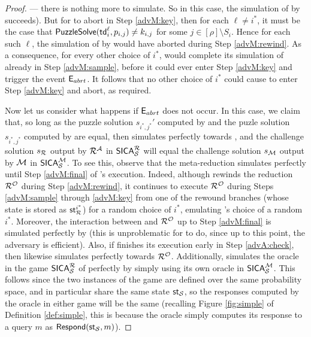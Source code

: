 \begin{proof}
  --- there is nothing more to simulate. So in this case, the simulation of \advA by \redM succeeds).
  But for \redM to abort in Step \ref{advM:key},
  then for each \(\ell \ne i^{*}\),
  it must be the case that
  \(\mathsf{PuzzleSolve}(\mathsf{td}_{i}^{\ell},p_{i,j}) \ne k_{i,j}\) for some \(j \in [\rho] \setminus S_{i}\).
  Hence for each such \(\ell\), the simulation of \advA by \redM
  would have aborted during Step \ref{advM:rewind}.
  As a consequence, for every other choice of \(i^{*}\),
  \redM would complete its simulation of \advA already in Step \ref{advM:sample},
  before it could ever enter Step \ref{advM:key} and trigger the event \(\mathsf{E}_{abrt}\).
  It follows that no other choice of \(i^{*}\) could cause
  \redM to enter Step \ref{advM:key} and abort, as required.

  Now let us consider what happens if \(\mathsf{E}_{abrt}\) does not occur.
  In this case, we claim that, so long as the puzzle solution
  \(s_{i^{*},j^{*}}'\) computed by \redM
  and the puzle solution \(s_{i^{*},j^{*}}\) computed by \advA are equal,
  then \redM simulates \advA perfectly towards \redR,
  and the challenge solution \(s_{\redR}\) output by \(\redR^{\advA}\) in \(\SICA_{\Simple}^{\redR}\)
  will equal the challenge solution \(s_{\mathcal{M}}\) output by \(\mathcal{M}\)
  in \(\mathsf{SICA}_{\mathcal{S}}^{\mathcal{M}}\).
  To see this, observe that the meta-reduction \redM simulates \advA
  perfectly until Step \ref{advM:final} of \redM's execution.
  Indeed, although \redM rewinds the reduction \(\redR^{\oracle}\)
  during Step \ref{advM:rewind},
  it continues to execute \(\redR^{\oracle}\) during Steps \ref{advM:sample} through \ref{advM:key}
  from one of the rewound branches (whose state is stored as \(\state_{\redR}^{i^{*}}\))
  for a random choice of \(i^{*}\), emulating \advA's choice of a random \(i^{*}\).
  Moreover, the interaction between \advA and \(\redR^{\oracle}\)
  up to Step \ref{advM:final} is simulated perfectly by \redM
  (this is unproblematic for \redM to do, since up to this point, the adversary \advA is efficient).
  Also, if \advA finishes its execution early in Step \ref{advA:check},
  then \redM likewise simulates \advA perfectly towards \(\redR^{\oracle}\).
  Additionally, \redM simulates the oracle \oracle
  in the game \(\SICA_{\Simple}^{\redR}\) of \redR perfectly
  by simply using its own oracle \oracle in \(\mathsf{SICA}_{\mathcal{S}}^{\mathcal{M}}\).
  This follows since the two instances of the \SICA game are defined over the same probability space,
  and in particular share the same state \(\mathsf{st}_{\mathcal{S}}\),
  so the responses computed by the oracle \oracle in either game will be the same
  (recalling Figure \ref{fig:simple} of Definition \ref{def:simple},
  this is because the oracle \oracle simply computes its response to a query \(m\)
  as \(\mathsf{Respond}(\mathsf{st}_{\mathcal{S}},m)\)).


\end{proof}
